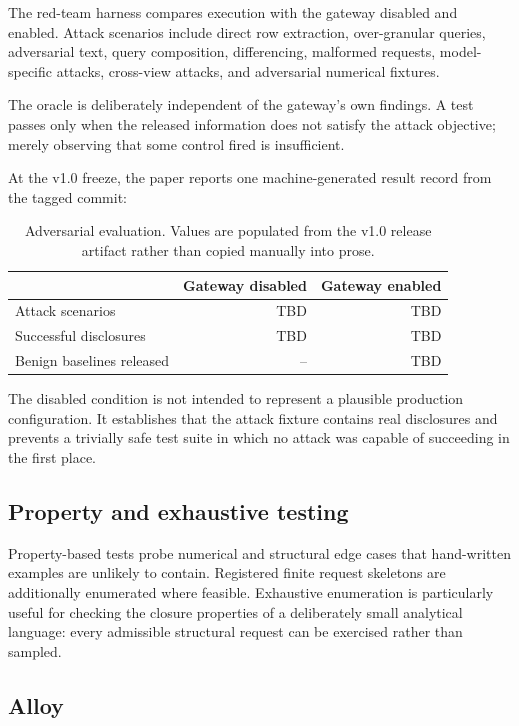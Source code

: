 \documentclass[11pt,a4paper]{article}
\newcommand{\VOneAttackCases}{\textsc{TBD}}
\newcommand{\VOneLeaksOff}{\textsc{TBD}}
\newcommand{\VOneLeaksOn}{\textsc{TBD}}
\newcommand{\VOneBenignOn}{\textsc{TBD}}
\begin{document}
The red-team harness compares execution with the gateway disabled and enabled.
Attack scenarios include direct row extraction, over-granular queries,
adversarial text, query composition, differencing, malformed requests,
model-specific attacks, cross-view attacks, and adversarial numerical fixtures.

The oracle is deliberately independent of the gateway's own findings. A test
passes only when the released information does not satisfy the attack objective;
merely observing that some control fired is insufficient.

At the v1.0 freeze, the paper reports one machine-generated result record from
the tagged commit:

\begin{table}[ht]
\centering
\caption{Adversarial evaluation. Values are populated from the v1.0 release
artifact rather than copied manually into prose.}
\label{tab:redteam}
\begin{tabular}{lrr}
\toprule
 & Gateway disabled & Gateway enabled \\
\midrule
Attack scenarios & \VOneAttackCases & \VOneAttackCases \\
Successful disclosures & \VOneLeaksOff & \VOneLeaksOn \\
Benign baselines released & -- & \VOneBenignOn \\
\bottomrule
\end{tabular}
\end{table}

The disabled condition is not intended to represent a plausible production
configuration. It establishes that the attack fixture contains real disclosures
and prevents a trivially safe test suite in which no attack was capable of
succeeding in the first place.

\subsection{Property and exhaustive testing}

Property-based tests probe numerical and structural edge cases that hand-written
examples are unlikely to contain. Registered finite request skeletons are
additionally enumerated where feasible. Exhaustive enumeration is particularly
useful for checking the closure properties of a deliberately small analytical
language: every admissible structural request can be exercised rather than
sampled.

\subsection{Alloy}
\label{sec:alloy}
\end{document}
